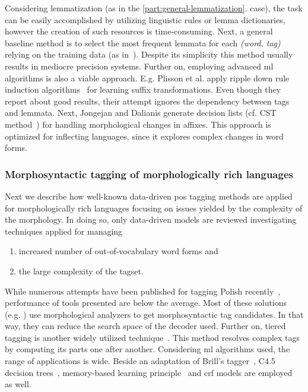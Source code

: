 Considering lemmatization (as in the \ref{part:general-lemmatization}. case), the task can be easily accomplished by utilizing linguistic rules or lemma dictionaries, however the creation of such resources is time-consuming.
Next, a general baseline method is to select the most frequent lemmata for each \emph{(word, tag)} relying on the training data (as in~\cite{zsibrata2013magyarlanc}). 
Despite its simplicity this method usually results in mediocre precision systems.
Further on, employing advanced \gls{ml} algorithms is also a viable approach.
E.g. Plisson et al. apply ripple down rule induction algorithms~\cite{Plisson2004} for learning suffix transformations.
Even though they report about good results, their attempt ignores the dependency between tags and lemmata.
Next, Jongejan and Dalianis generate decision lists (cf. CST method~\cite{Jongejan}) for handling morphological changes in affixes.
This approach is optimized for inflecting languages, since it explores complex changes in word forms.  

\subsubsection{Morphosyntactic tagging of morphologically rich languages}

Next we describe how well-known data-driven \gls{pos} tagging methods are applied for morphologically rich languages focusing on issues yielded by the complexity of the morphology.
In doing so, only data-driven models are reviewed investigating techniques applied for managing
\begin{enumerate}
  \item increased number of out-of-vocabulary word forms and
  \item the large complexity of the tagset. 
\end{enumerate}

While numerous attempts have been published for tagging Polish recently~\cite{Piasecki2006,Piasecki2007,Acedanski2010,Radziszewski2013},  performance of tools presented are below the average.
Most of these solutions (e.g. \cite{Radziszewski2013}) use morphological analyzers to get morphosyntactic tag candidates. In that way, they can reduce the search space of the decoder used.
Further on, tiered tagging is another widely utilized technique~\cite{Radziszewski2013}.
This method resolves complex tags by computing its parts one after another.
Considering \acrshort{ml} algorithms used, the range of applications is wide.
Beside an adaptation of Brill’s tagger~\cite{Acedanski2010}, C4.5 decision trees~\cite{Piasecki2007}, memory-based learning principle~\cite{Radziszewski2011} and \acrshort{crf} models are employed~\cite{Radziszewski2013} as well. 


